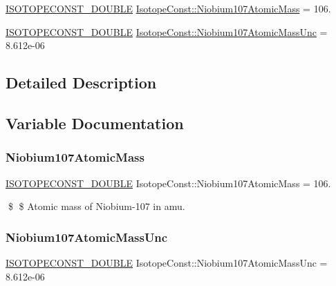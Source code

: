 \begin{DoxyCompactItemize}
\item 
\mbox{\hyperlink{group___isotope_const-_macros_ga8f45a7272ce02c0b4c65c44636ed719a}{I\+S\+O\+T\+O\+P\+E\+C\+O\+N\+S\+T\+\_\+\+D\+O\+U\+B\+LE}} \mbox{\hyperlink{group___isotope_const-_niobium-_nb107_gaaab33d9dbdb5a98ad9eb39bfbd2d9063}{Isotope\+Const\+::\+Niobium107\+Atomic\+Mass}} = 106.
\item 
\mbox{\hyperlink{group___isotope_const-_macros_ga8f45a7272ce02c0b4c65c44636ed719a}{I\+S\+O\+T\+O\+P\+E\+C\+O\+N\+S\+T\+\_\+\+D\+O\+U\+B\+LE}} \mbox{\hyperlink{group___isotope_const-_niobium-_nb107_ga7ce78a1828e46097532322765e99a664}{Isotope\+Const\+::\+Niobium107\+Atomic\+Mass\+Unc}} = 8.\+612e-\/06
\end{DoxyCompactItemize}


\subsection{Detailed Description}


\subsection{Variable Documentation}
\mbox{\label{group___isotope_const-_niobium-_nb107_gaaab33d9dbdb5a98ad9eb39bfbd2d9063}} 
\subsubsection{\texorpdfstring{Niobium107\+Atomic\+Mass}{Niobium107AtomicMass}}
{\footnotesize\ttfamily \mbox{\hyperlink{group___isotope_const-_macros_ga8f45a7272ce02c0b4c65c44636ed719a}{I\+S\+O\+T\+O\+P\+E\+C\+O\+N\+S\+T\+\_\+\+D\+O\+U\+B\+LE}} Isotope\+Const\+::\+Niobium107\+Atomic\+Mass = 106.}

\$ \$ Atomic mass of Niobium-\/107 in amu. \mbox{\label{group___isotope_const-_niobium-_nb107_ga7ce78a1828e46097532322765e99a664}} 
\subsubsection{\texorpdfstring{Niobium107\+Atomic\+Mass\+Unc}{Niobium107AtomicMassUnc}}
{\footnotesize\ttfamily \mbox{\hyperlink{group___isotope_const-_macros_ga8f45a7272ce02c0b4c65c44636ed719a}{I\+S\+O\+T\+O\+P\+E\+C\+O\+N\+S\+T\+\_\+\+D\+O\+U\+B\+LE}} Isotope\+Const\+::\+Niobium107\+Atomic\+Mass\+Unc = 8.\+612e-\/06}

